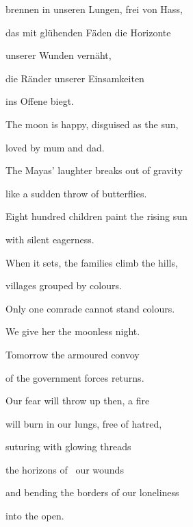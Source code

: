brennen in unseren Lungen, frei von Hass,


\bigskip

das mit glühenden Fäden die Horizonte 

unserer Wunden vernäht,


\bigskip

die Ränder unserer Einsamkeiten 

ins Offene biegt.


\bigskip


\bigskip


\bigskip


\bigskip



\bigskip

The moon is happy, disguised as the sun,

loved by mum and dad.


\bigskip

The Mayas' laughter breaks out of gravity

like a sudden throw of butterflies.


\bigskip

Eight hundred children paint the rising sun

with silent eagerness.


\bigskip

When it sets, the families climb the hills,

villages grouped by colours.


\bigskip

Only one comrade cannot stand colours.

We give her the moonless night.


\bigskip

Tomorrow the armoured convoy

of the government forces returns.


\bigskip

Our fear will throw up then, a fire 

will burn in our lungs, free of hatred,


\bigskip

suturing with glowing threads 

the horizons of \ our wounds


\bigskip

and bending the borders of our loneliness

into the open.


\bigskip


\bigskip


